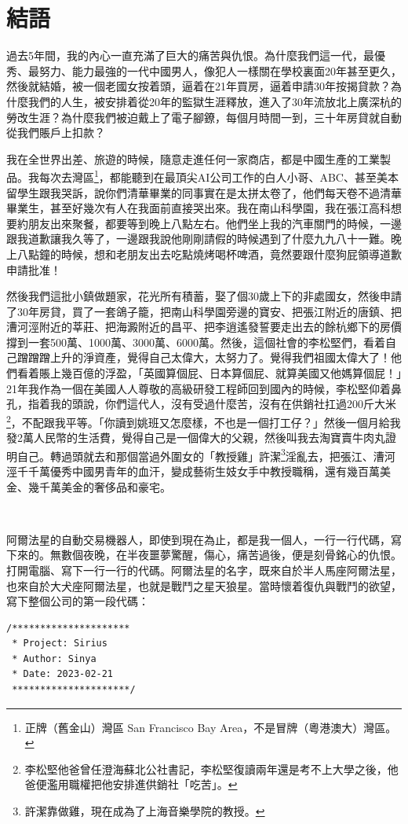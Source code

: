 \chapter{結語}

過去5年間，我的內心一直充滿了巨大的痛苦與仇恨。為什麼我們這一代，最優秀、最努力、能力最強的一代中國男人，像犯人一樣關在學校裏面20年甚至更久，然後就結婚，被一個老國女按着頭，逼着在21年買房，逼着申請30年按揭貸款？為什麼我們的人生，被安排着從20年的監獄生涯釋放，進入了30年流放北上廣深杭的勞改生涯？為什麼我們被迫戴上了電子腳鐐，每個月時間一到，三十年房貸就自動從我們賬戶上扣款？

我在全世界出差、旅遊的時候，隨意走進任何一家商店，都是中國生產的工業製品。我每次去灣區\footnote{正牌（舊金山）灣區 San Francisco Bay Area，不是冒牌（粵港澳大）灣區。}，都能聽到在最頂尖AI公司工作的白人小哥、ABC、甚至美本留學生跟我哭訴，說你們清華畢業的同事實在是太拼太卷了，他們每天卷不過清華畢業生，甚至好幾次有人在我面前直接哭出來。我在南山科學園，我在張江高科想要約朋友出來聚餐，都要等到晚上八點左右。他們坐上我的汽車關門的時候，一邊跟我道歉讓我久等了，一邊跟我說他剛剛請假的時候遇到了什麼九九八十一難。晚上八點鐘的時候，想和老朋友出去吃點燒烤喝杯啤酒，竟然要跟什麼狗屁領導道歉申請批准！

然後我們這批小鎮做題家，花光所有積蓄，娶了個30歲上下的非處國女，然後申請了30年房貸，買了一套鴿子籠，把南山科學園旁邊的寶安、把張江附近的唐鎮、把漕河涇附近的莘莊、把海澱附近的昌平、把李逍遙發誓要走出去的餘杭鄉下的房價撐到一套500萬、1000萬、3000萬、6000萬。然後，這個社會的李松堅們，看着自己蹭蹭蹭上升的淨資產，覺得自己太偉大，太努力了。覺得我們祖國太偉大了！他們看着賬上幾百億的浮盈，「英國算個屁、日本算個屁、就算美國又他媽算個屁！」21年我作為一個在美國人人尊敬的高級研發工程師回到國內的時候，李松堅仰着鼻孔，指着我的頭說，你們這代人，沒有受過什麼苦，沒有在供銷社扛過200斤大米\footnote{李松堅他爸曾任澄海蘇北公社書記，李松堅復讀兩年還是考不上大學之後，他爸便濫用職權把他安排進供銷社「吃苦」。}，不配跟我平等。「你讀到姚班又怎麼樣，不也是一個打工仔？」然後一個月給我發2萬人民幣的生活費，覺得自己是一個偉大的父親，然後叫我去淘寶賣牛肉丸證明自己。轉過頭就去和那個當過外圍女的「教授雞」許潔\footnote{許潔靠做雞，現在成為了上海音樂學院的教授。}淫亂去，把張江、漕河涇千千萬優秀中國男青年的血汗，變成藝術生妓女手中教授職稱，還有幾百萬美金、幾千萬美金的奢侈品和豪宅。

\ 

阿爾法星的自動交易機器人，即使到現在為止，都是我一個人，一行一行代碼，寫下來的。無數個夜晚，在半夜噩夢驚醒，傷心，痛苦過後，便是刻骨銘心的仇恨。打開電腦、寫下一行一行的代碼。阿爾法星的名字，既來自於半人馬座阿爾法星，也來自於大犬座阿爾法星，也就是戰鬥之星天狼星。當時懷着復仇與戰鬥的欲望，寫下整個公司的第一段代碼：\begin{verbatim}
/*********************
 * Project: Sirius
 * Author: Sinya
 * Date: 2023-02-21
 *********************/
\end{verbatim}

